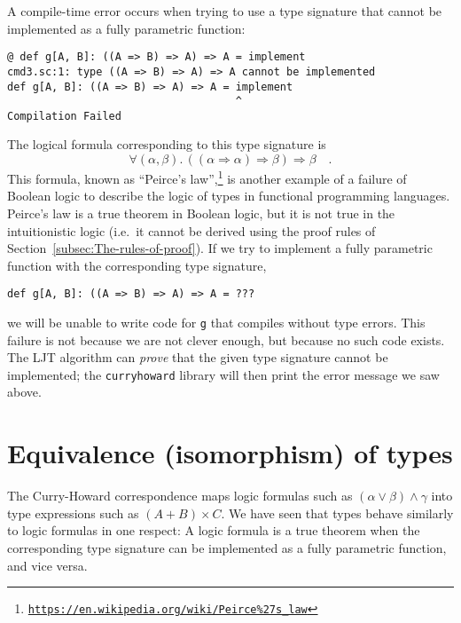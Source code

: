 A compile-time error occurs when trying to use a type signature that
cannot be implemented as a fully parametric function:
\begin{lstlisting}
@ def g[A, B]: ((A => B) => A) => A = implement
cmd3.sc:1: type ((A => B) => A) => A cannot be implemented
def g[A, B]: ((A => B) => A) => A = implement
                                    ^
Compilation Failed
\end{lstlisting}
The logical formula corresponding to this type signature is 
\begin{equation}
\forall(\alpha,\beta).\,\left(\left(\alpha\Rightarrow\alpha\right)\Rightarrow\beta\right)\Rightarrow\beta\quad.\label{eq:ch-example-3-peirce-law}
\end{equation}
This formula, known as ``Peirce's law'',\footnote{\texttt{\href{https://en.wikipedia.org/wiki/Peirce\%27s_law}{https://en.wikipedia.org/wiki/Peirce\%27s\_law}}}
is another example of a failure of Boolean logic to describe the logic
of types in functional programming languages. Peirce's law is a true
theorem in Boolean logic, but it is not true in the intuitionistic
logic (i.e.~it cannot be derived using the proof rules of Section~\ref{subsec:The-rules-of-proof}).
If we try to implement a fully parametric function with the corresponding
type signature,
\begin{lstlisting}
def g[A, B]: ((A => B) => A) => A = ???
\end{lstlisting}
we will be unable to write code for \lstinline!g!
that compiles without type errors. This failure is not because we
are not clever enough, but because no such code exists. The LJT algorithm
can \emph{prove} that the given type signature cannot be implemented;
the \texttt{curryhoward} library will then print the error message
we saw above. 

\section{Equivalence (isomorphism) of types}

The Curry-Howard correspondence maps logic formulas such as $(\alpha\vee\beta)\wedge\gamma$
into type expressions such as $\left(A+B\right)\times C$. We have
seen that types behave similarly to logic formulas in one respect:
A logic formula is a true theorem when the corresponding type signature
can be implemented as a fully parametric function, and vice versa.

